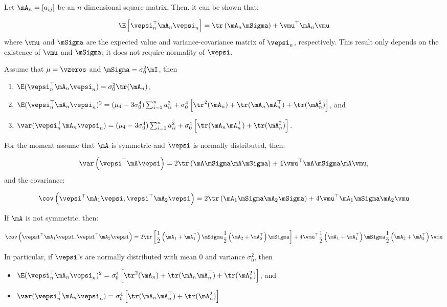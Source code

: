 \documentclass[english,12pt]{book}\usepackage[]{graphicx}\usepackage[]{xcolor}
\begin{document}
\begin{lemma}\label{lemma:second-mom-lee}
Let $\mA_n=\left[a_{ij}\right]$ be an $n$-dimensional square matrix. Then, it can be shown that:

\begin{equation*}
\E\left[\vepsi^\top_n\mA_n\vepsi_n\right]=\tr\left(\mA_n\mSigma\right)+\vmu^\top\mA_n\vmu
\end{equation*}
%
where $\vmu$ and $\mSigma$ are the expected value and variance-covariance matrix of $\vepsi_n$, respectively. This result only depends on the existence of $\vmu$ and $\mSigma$; it does not require normality of $\vepsi$. 

Assume that $\mu = \vzeros$ and $\mSigma = \sigma_0^2\mI$, then

\begin{enumerate}
  \item $\E(\vepsi_n^\top\mA_n\vepsi_n) = \sigma^2_0\tr(\mA_n)$,
  \item $\E(\vepsi_n^\top\mA_n\vepsi_n)^2 = (\mu_4 - 3\sigma^4_0)\sum_{i = 1}^na_{ii}^2+\sigma^4_0\left[\tr^2(\mA_n) + \tr(\mA_n\mA_n^\top)+\tr(\mA^2_n)\right]$, and
  \item $\var(\vepsi_n^\top\mA_n\vepsi_n) = (\mu_4 - 3\sigma^4_0)\sum_{i = 1}^na_{ii}^2+\sigma^4_0\left[\tr(\mA_n\mA_n^\top)+\tr(\mA^2_n)\right]$.
\end{enumerate}

For the moment assume that $\mA$ is symmetric and $\vepsi$ is normally distributed, then:

\begin{equation*}
\var\left(\vepsi^\top\mA\vepsi\right)= 2\tr\left(\mA\mSigma\mA\mSigma\right) + 4\vmu^\top\mA\mSigma\mA\vmu,
\end{equation*}
%
and the covariance:

\begin{equation*}
\cov\left(\vepsi^\top\mA_1\vepsi, \vepsi^\top\mA_2\vepsi\right)= 2\tr\left(\mA_1\mSigma\mA_2\mSigma\right) + 4\vmu^\top\mA_1\mSigma\mA_2\vmu
\end{equation*}

If $\mA$ is not symmetric, then:

\begin{equation}\label{eq:var-quadratic-form}
\cov\left(\vepsi^\top\mA_1\vepsi, \vepsi^\top\mA_2\vepsi\right)= 2\tr\left[\frac{1}{2}\left(\mA_1 + \mA_1^\top\right)\mSigma\frac{1}{2}\left(\mA_2 + \mA_2^\top\right)\mSigma\right] + 4\vmu^\top\frac{1}{2}\left(\mA_1 + \mA_1^\top\right)\mSigma\frac{1}{2}\left(\mA_2 + \mA_2^\top\right)\vmu
\end{equation}

In particular, if $\vepsi$'s are normally distributed with mean 0 and variance $\sigma_0^2$, then 

\begin{itemize}
  \item $\E(\vepsi_n^\top\mA_n\vepsi_n)^2 = \sigma^4_0\left[\tr^2(\mA_n) + \tr(\mA_n\mA_n^\top)+\tr(\mA^2_n)\right]$, and
  \item $\var(\vepsi_n^\top\mA_n\vepsi_n) = \sigma^4_0\left[\tr(\mA_n\mA_n^\top)+\tr(\mA^2_n)\right]$
\end{itemize}
\end{lemma}
\end{document}
